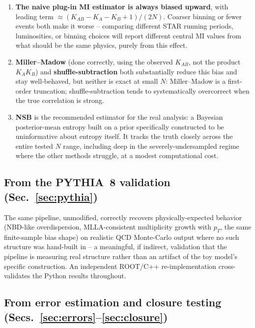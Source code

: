 \documentclass[11pt]{article}
\begin{document}
\begin{enumerate}

\item \textbf{The naive plug-in MI estimator is always biased upward},
with leading term $\approx(K_{AB}-K_A-K_B+1)/(2N)$. Coarser binning or
fewer events both make it worse -- comparing different STAR running
periods, luminosities, or binning choices will report different central
MI values from what should be the same physics, purely from this effect.

\item \textbf{Miller--Madow} (done correctly, using the observed
$K_{AB}$, not the product $K_AK_B$) and \textbf{shuffle-subtraction} both
substantially reduce this bias and stay well-behaved, but neither is exact
at small $N$: Miller--Madow is a first-order truncation;
shuffle-subtraction tends to systematically overcorrect when the true
correlation is strong.

\item \textbf{NSB} is the recommended estimator for the real analysis: a
Bayesian posterior-mean entropy built on a prior specifically constructed
to be uninformative about entropy itself. It tracks the truth closely
across the entire tested $N$ range, including deep in the
severely-undersampled regime where the other methods struggle, at a
modest computational cost.

\end{enumerate}

\subsection{From the PYTHIA~8 validation (Sec.~\ref{sec:pythia})}

The same pipeline, unmodified, correctly recovers physically-expected
behavior (NBD-like overdispersion, MLLA-consistent multiplicity growth
with $p_T$, the same finite-sample bias shape) on realistic QCD
Monte-Carlo output where no such structure was hand-built in -- a
meaningful, if indirect, validation that the pipeline is measuring real
structure rather than an artifact of the toy model's specific
construction. An independent ROOT/C++ re-implementation cross-validates
the Python results throughout.

\subsection{From error estimation and closure testing (Secs.~\ref{sec:errors}--\ref{sec:closure})}
\end{document}
